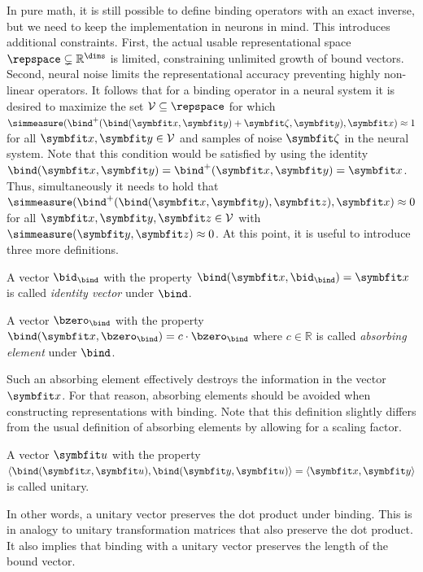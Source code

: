 In pure math, it is still possible to define binding operators with an exact inverse, but we need to keep the implementation in neurons in mind.
This introduces additional constraints.
First, the actual usable representational space $\repspace \subsetneq \mathbb{R}^{\dims}$ is limited, constraining unlimited growth of bound vectors.
Second, neural noise limits the representational accuracy preventing highly non-linear operators.
It follows that for a binding operator in a neural system it is desired to maximize the set $\mathcal{V} \subseteq \repspace$ for which  $\simmeasure(\bind^+(\bind(\vc x, \vc y) + \vc\zeta, \vc y), \vc x) \approx 1$ for all $\vc x, \vc y \in \mathcal{V}$ and samples of noise $\vc\zeta$ in the neural system.
Note that this condition would be satisfied by using the identity $\bind(\vc x, \vc y) = \bind^+(\vc x, \vc y) = \vc x$.
Thus, simultaneously it needs to hold that $\simmeasure(\bind^+(\bind(\vc x, \vc y), \vc z), \vc x) \approx 0$ for all $\vc x, \vc y, \vc z \in \mathcal{V}$ with $\simmeasure(\vc y, \vc z) \approx 0$.
At this point, it is useful to introduce three more definitions.

\begin{defn}
    A vector $\bid_{\bind}$ with the property $\bind(\vc x, \bid_{\bind}) = \vc x$ is called \emph{identity vector} under $\bind$.
\end{defn}
\begin{defn}
    A vector $\bzero_{\bind}$ with the property $\bind(\vc x, \bzero_{\bind}) = c \cdot \bzero_{\bind}$ where $c \in \mathbb{R}$ is called \emph{absorbing element} under $\bind$.
\end{defn}
Such an absorbing element effectively destroys the information in the vector $\vc x$.
For that reason, absorbing elements should be avoided when constructing representations with binding.
Note that this definition slightly differs from the usual definition of absorbing elements by allowing for a scaling factor.
\begin{defn}
    A vector $\vc u$ with the property $\langle \bind(\vc x, \vc u), \bind(\vc y, \vc u) \rangle = \langle \vc x, \vc y \rangle$ is called unitary.
\end{defn}
In other words, a unitary vector preserves the dot product under binding.
This is in analogy to unitary transformation matrices that also preserve the dot product.
It also implies that binding with a unitary vector preserves the length of the bound vector.


